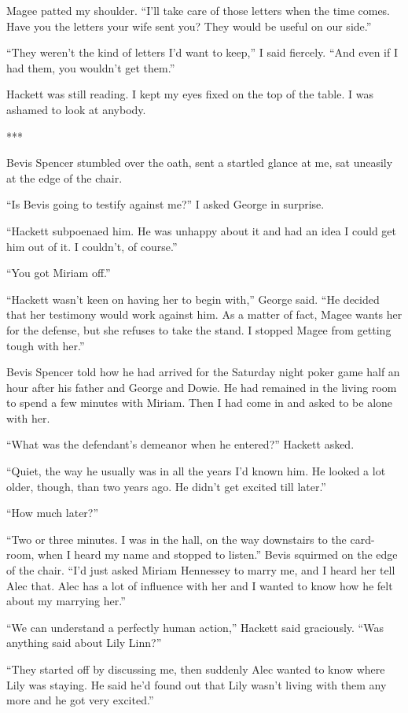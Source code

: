 \documentclass{novel}
\begin{document}
Magee patted my shoulder. “I’ll take care of those letters when the time comes. Have you the letters your wife sent you? They would be useful on our side.”

“They weren’t the kind of letters I’d want to keep,” I said fiercely. “And even if I had them, you wouldn’t get them.”

Hackett was still reading. I kept my eyes fixed on the top of the table. I was ashamed to look at anybody.

***

Bevis Spencer stumbled over the oath, sent a startled glance at me, sat uneasily at the edge of the chair.

“Is Bevis going to testify against me?” I asked George in surprise.

“Hackett subpoenaed him. He was unhappy about it and had an idea I could get him out of it. I couldn’t, of course.”

“You got Miriam off.”

“Hackett wasn’t keen on having her to begin with,” George said. “He decided that her testimony would work against him. As a matter of fact, Magee wants her for the defense, but she refuses to take the stand. I stopped Magee from getting tough with her.”

Bevis Spencer told how he had arrived for the Saturday night poker game half an hour after his father and George and Dowie. He had remained in the living room to spend a few minutes with Miriam. Then I had come in and asked to be alone with her.

“What was the defendant’s demeanor when he entered?” Hackett asked.

“Quiet, the way he usually was in all the years I’d known him. He looked a lot older, though, than two years ago. He didn’t get excited till later.”

“How much later?”

“Two or three minutes. I was in the hall, on the way downstairs to the card-room, when I heard my name and stopped to listen.” Bevis squirmed on the edge of the chair. “I’d just asked Miriam Hennessey to marry me, and I heard her tell Alec that. Alec has a lot of influence with her and I wanted to know how he felt about my marrying her.”

“We can understand a perfectly human action,” Hackett said graciously. “Was anything said about Lily Linn?”

“They started off by discussing me, then suddenly Alec wanted to know where Lily was staying. He said he’d found out that Lily wasn’t living with them any more and he got very excited.”
\end{document}
